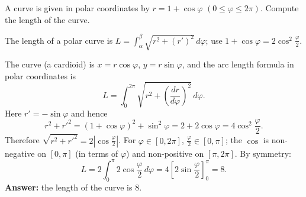 
\begin{question}
A curve is given in polar coordinates by $r=1+\cos\varphi$ $(0\le\varphi\le2\pi)$. Compute the length of the curve.
\end{question}

\begin{hint}
The length of a polar curve is $L=\int_\alpha^\beta\sqrt{r^2+(r')^2}\,d\varphi$; use $1+\cos\varphi=2\cos^2\frac\varphi2$.
\end{hint}

\begin{solution}
The curve (a cardioid) is $x=r\cos\varphi$, $y=r\sin\varphi$, and the arc length formula in polar coordinates is
\[ L=\int_0^{2\pi}\sqrt{r^2+\left(\frac{dr}{d\varphi}\right)^2}\,d\varphi. \]
Here $r'=-\sin\varphi$ and hence
\[ r^2+r'^2=(1+\cos\varphi)^2+\sin^2\varphi=2+2\cos\varphi=4\cos^2\frac\varphi2. \]
Therefore $\sqrt{r^2+r'^2}=2\left|\cos\frac\varphi2\right|$. For $\varphi\in[0,2\pi]$, $\frac\varphi2\in[0,\pi]$; the $\cos$ is non-negative on $[0,\pi]$ (in terms of $\varphi$) and non-positive on $[\pi,2\pi]$. By symmetry:
\[ L=2\int_0^{\pi}2\cos\frac\varphi2\,d\varphi=4\left[2\sin\frac\varphi2\right]_0^\pi=8. \]
\textbf{Answer:} the length of the curve is $8$.
\end{solution}

